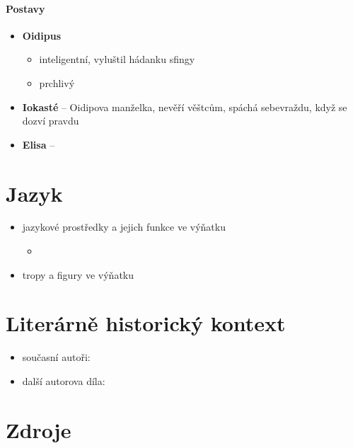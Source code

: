 \documentclass[10pt,a4paper]{article}
\begin{document}
\paragraph{Postavy}
\begin{itemize}
\item \textbf{Oidipus}
	\begin{itemize}
	\item inteligentní, vyluštil hádanku sfingy
	\item prchlivý
	\end{itemize}
\item \textbf{Iokasté} -- Oidipova manželka, nevěří věštcům, spáchá sebevraždu, když se dozví pravdu
\item \textbf{Elisa} --
\end{itemize}
\section*{Jazyk}
\begin{itemize}
\item jazykové prostředky a jejich funkce ve výňatku
	\begin{itemize}
	\item 
	\end{itemize}
\item tropy a figury ve výňatku
\end{itemize}
\section*{Literárně historický kontext}
\begin{itemize}
\item současní autoři:
\item další autorova díla:
\end{itemize}
\section*{Zdroje}
\end{document}

